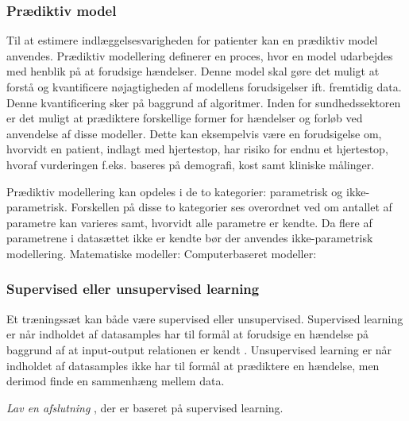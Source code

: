 \subsubsection{Prædiktiv model}
\noindent
Til at estimere indlæggelsesvarigheden for patienter kan en prædiktiv model anvendes.
Prædiktiv modellering definerer en proces, hvor en model udarbejdes med henblik på at forudsige hændelser. Denne model skal gøre det muligt at forstå og kvantificere nøjagtigheden af modellens forudsigelser ift. fremtidig data.\cite{Kuhn2013} Denne kvantificering sker på baggrund af algoritmer. 
Inden for sundhedssektoren er det muligt at prædiktere forskellige former for hændelser og forløb ved anvendelse af disse modeller. Dette kan eksempelvis være en forudsigelse om, hvorvidt en patient, indlagt med hjertestop, har risiko for endnu et hjertestop, hvoraf vurderingen f.eks. baseres på demografi, kost samt kliniske målinger\cite{Hastie2008}. %

Prædiktiv modellering kan opdeles i de to kategorier: parametrisk og ikke-parametrisk. Forskellen på disse to kategorier ses overordnet ved om antallet af parametre kan varieres samt, hvorvidt alle parametre er kendte. Da flere af parametrene i datasættet ikke er kendte bør der anvendes ikke-parametrisk modellering.\cite{Sheskin2000}
Matematiske modeller:
Computerbaseret modeller: 


\subsubsection{Supervised eller unsupervised learning}
Et træningssæt kan både være supervised eller unsupervised. Supervised learning er når indholdet af datasamples har til formål at forudsige en hændelse på baggrund af at input-output relationen er kendt \cite{Brownlee2013}. Unsupervised learning er når indholdet af datasamples ikke har til formål at prædiktere en hændelse, men derimod finde en sammenhæng mellem data.\cite{Brownlee2013, Kuhn2013} 

\textit{Lav en afslutning}
, der er baseret på supervised learning. 

